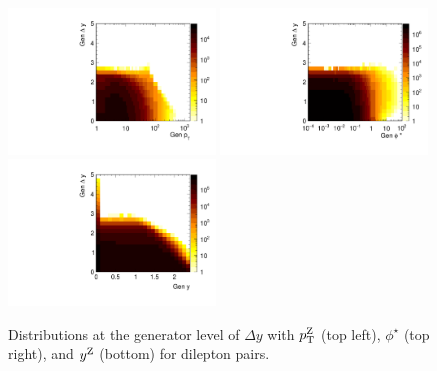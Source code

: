 \begin{figure}
	\centering
	\includegraphics[width=0.49\textwidth]{figures/zpt/ptVdy.pdf}
	\includegraphics[width=0.49\textwidth]{figures/zpt/phiVdy.pdf}
	\includegraphics[width=0.49\textwidth]{figures/zpt/rapVdy.pdf}
	\caption{Distributions at the generator level of $\Delta y$ with $p_{\mathrm{T}}^{\mathrm{Z}}$ (top left), $\phi^\star$ (top right), and $y^{\mathrm{Z}}$ (bottom) for dilepton pairs.}
	\label{fig:gendist3}
\end{figure}


